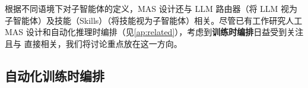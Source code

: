 
根据不同语境下对子智能体的定义，MAS 设计还与 LLM 路由器{\citep{su2025toolorchestraelevatingintelligenceefficient,zhang2025routerr1teachingllmsmultiround}}（将 LLM 视为子智能体）及技能（Skills）\citep{anthropic_agent_skills_2024}（将技能视为子智能体）相关。尽管已有工作研究人工 MAS 设计和自动化推理时编排（见\cref{ap:related}），考虑到\textbf{训练时编排}日益受到关注且与 \ourframework 直接相关，我们将讨论重点放在这一方向。

\subsection{自动化训练时编排}





